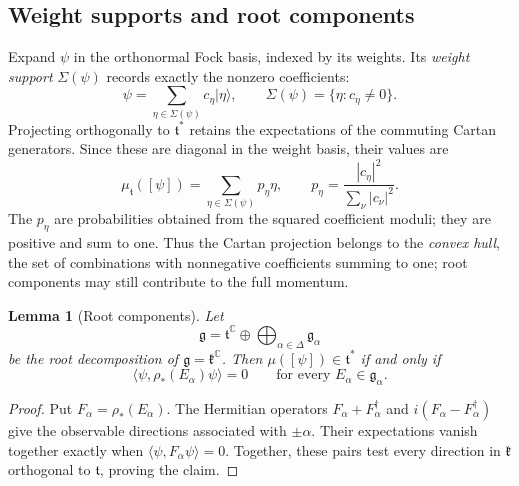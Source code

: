 \documentclass{article}
\newtheorem{lemma}[theorem]{Lemma}
\theoremstyle{definition}
\theoremstyle{remark}
\newcommand{\C}{\mathbb C}
\newcommand{\ket}[1]{\lvert #1\rangle}
\begin{document}
\subsection{Weight supports and root components}

Expand $\psi$ in the orthonormal Fock basis, indexed by its weights.
Its \emph{weight support} $\Sigma(\psi)$ records exactly the nonzero
coefficients:
\begin{equation}
 \psi=\sum_{\eta\in\Sigma(\psi)}c_\eta\ket\eta,\qquad
 \Sigma(\psi)=\{\eta:c_\eta\ne0\}.
 \label{eq:weight-support}
\end{equation}
Projecting orthogonally to $\mathfrak t^*$ retains the expectations of
the commuting Cartan generators. Since these are diagonal in the weight
basis, their values are
\begin{equation}
 \mu_{\mathfrak t}([\psi])
 =\sum_{\eta\in\Sigma(\psi)}p_\eta\eta,\qquad
 p_\eta=\frac{|c_\eta|^2}{\sum_\nu|c_\nu|^2}.
 \label{eq:cartan-momentum}
\end{equation}
The $p_\eta$ are probabilities obtained from the squared coefficient
moduli; they are positive and sum to one. Thus the Cartan projection belongs to the
\emph{convex hull}, the set of combinations with nonnegative coefficients
summing to one; root components may still contribute to the full momentum.

\begin{lemma}[Root components]
\label{lemma_cartan_roots}
Let
\begin{equation*}
 \mathfrak g=\mathfrak t^\C
 \oplus\bigoplus_{\alpha\in\Delta}\mathfrak g_\alpha
\end{equation*}
be the root decomposition of $\mathfrak g=\mathfrak k^\C$.  Then
$\mu([\psi])\in\mathfrak t^*$ if and only if
\begin{equation}
 \langle\psi,\rho_*(E_\alpha)\psi\rangle=0
 \qquad\text{for every }E_\alpha\in\mathfrak g_\alpha .
 \label{eq:root-components}
\end{equation}
\end{lemma}

\begin{proof}
Put $F_\alpha=\rho_*(E_\alpha)$. The Hermitian operators
$F_\alpha+F_\alpha^\dagger$ and $i(F_\alpha-F_\alpha^\dagger)$ give the
observable directions associated with $\pm\alpha$. Their expectations
vanish together exactly when $\langle\psi,F_\alpha\psi\rangle=0$.
Together, these pairs test every direction in $\mathfrak k$
orthogonal to $\mathfrak t$, proving the claim.
\end{proof}
\end{document}

